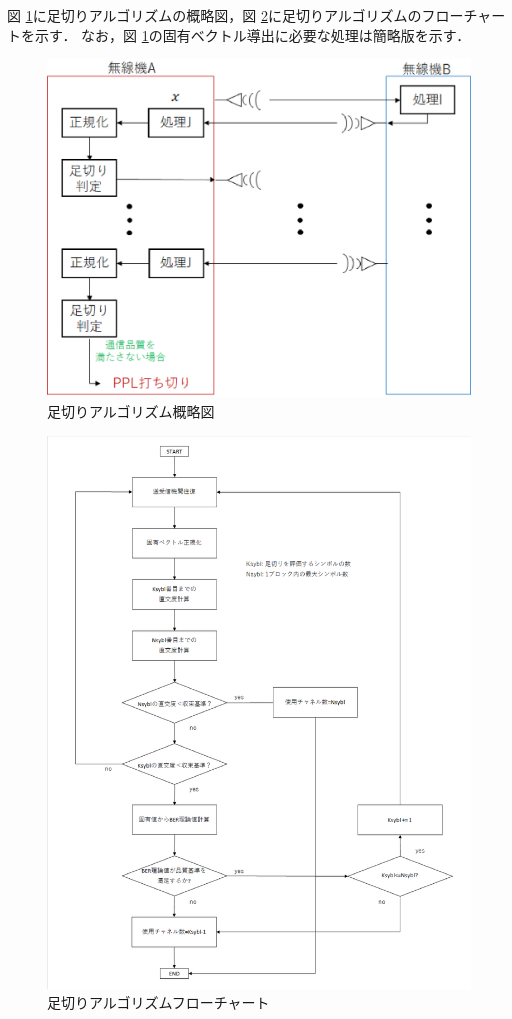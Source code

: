 図 \ref{figCutoff}に足切りアルゴリズムの概略図，図 \ref{figCutoffFlow}に足切りアルゴリズムのフローチャートを示す．
なお，図 \ref{figCutoff}の固有ベクトル導出に必要な処理は簡略版を示す．
\begin{figure}
    \centering
    \includegraphics[width=\linewidth]{chapter4/figure/Cutoff.eps}
    \caption{足切りアルゴリズム概略図}
    \label{figCutoff}
\end{figure}
\begin{figure}
    \centering
    \includegraphics[width=0.95\linewidth]{chapter4/figure/CutoffFlow.eps}
    \caption{足切りアルゴリズムフローチャート}
    \label{figCutoffFlow}
\end{figure}
